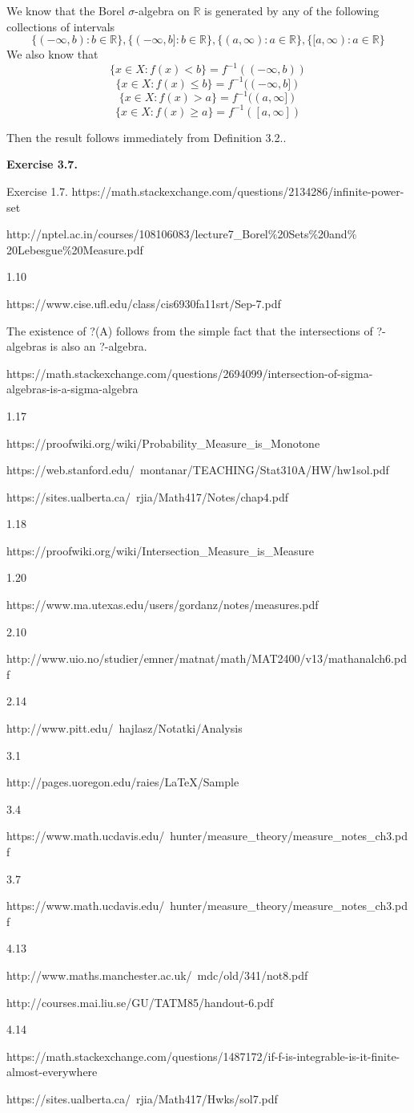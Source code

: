 \documentclass[12pt]{article}
\begin{document}
We know that the Borel $\sigma$-algebra on $\mathbb{R}$ is generated by any of the following collections of intervals
$$
\{(-\infty,b) : b \in \mathbb{R}\}, \{(-\infty,b] : b  \in \mathbb{R}\}, \{(a,\infty) :  a \in \mathbb{R}\}, \{[a, \infty) : a  \in \mathbb{R}\}
$$
We also know that 
$$ \{ x \in X : f(x) < b\} = f^{-1} ((-\infty,b))$$
$$ \{ x \in X : f(x) \leq b\} = f^{-1} ((-\infty,b]) $$
$$ \{ x \in X : f(x) > a\} = f^{-1} ((a,\infty]) $$
$$ \{ x \in X : f(x) \geq a\} = f^{-1} ([a,\infty])$$

 Then the result follows immediately from Definition 3.2..
 
 \textbf{Exercise 3.7.}

Exercise 1.7. https://math.stackexchange.com/questions/2134286/infinite-power-set

http://nptel.ac.in/courses/108106083/lecture7_Borel$\%$20Sets$\%$20and$\%$20Lebesgue$\%$20Measure.pdf

1.10

 https://www.cise.ufl.edu/class/cis6930fa11srt/Sep-7.pdf 

The existence of ?(A) follows from the simple fact that the intersections of ?-algebras is also an ?-algebra.

https://math.stackexchange.com/questions/2694099/intersection-of-sigma-algebras-is-a-sigma-algebra

1.17

https://proofwiki.org/wiki/Probability_Measure_is_Monotone

https://web.stanford.edu/~montanar/TEACHING/Stat310A/HW/hw1sol.pdf

https://sites.ualberta.ca/~rjia/Math417/Notes/chap4.pdf

1.18

https://proofwiki.org/wiki/Intersection_Measure_is_Measure

1.20

https://www.ma.utexas.edu/users/gordanz/notes/measures.pdf

2.10 

http://www.uio.no/studier/emner/matnat/math/MAT2400/v13/mathanalch6.pdf

2.14

http://www.pitt.edu/~hajlasz/Notatki/Analysis%

3.1

http://pages.uoregon.edu/raies/LaTeX/Sample%

3.4

https://www.math.ucdavis.edu/~hunter/measure_theory/measure_notes_ch3.pdf

3.7 

https://www.math.ucdavis.edu/~hunter/measure_theory/measure_notes_ch3.pdf

4.13 

http://www.maths.manchester.ac.uk/~mdc/old/341/not8.pdf

http://courses.mai.liu.se/GU/TATM85/handout-6.pdf

4.14

https://math.stackexchange.com/questions/1487172/if-f-is-integrable-is-it-finite-almost-everywhere

https://sites.ualberta.ca/~rjia/Math417/Hwks/sol7.pdf
\end{document}
